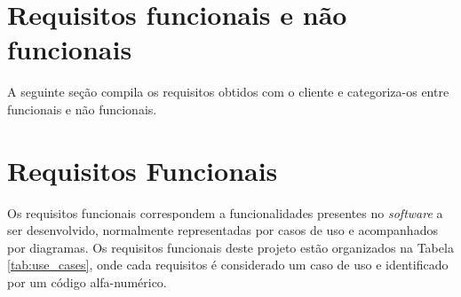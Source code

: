 \section{Requisitos funcionais e não funcionais}

A seguinte seção compila os requisitos obtidos com o cliente e categoriza-os entre funcionais e não funcionais.

\section{Requisitos Funcionais}

Os requisitos funcionais correspondem a funcionalidades presentes no \textit{software} a ser desenvolvido, normalmente representadas por casos de uso e acompanhados por diagramas. Os requisitos funcionais deste projeto estão organizados na Tabela \ref{tab:use_cases}, onde cada requisitos é considerado um caso de uso e identificado por um código alfa-numérico.


